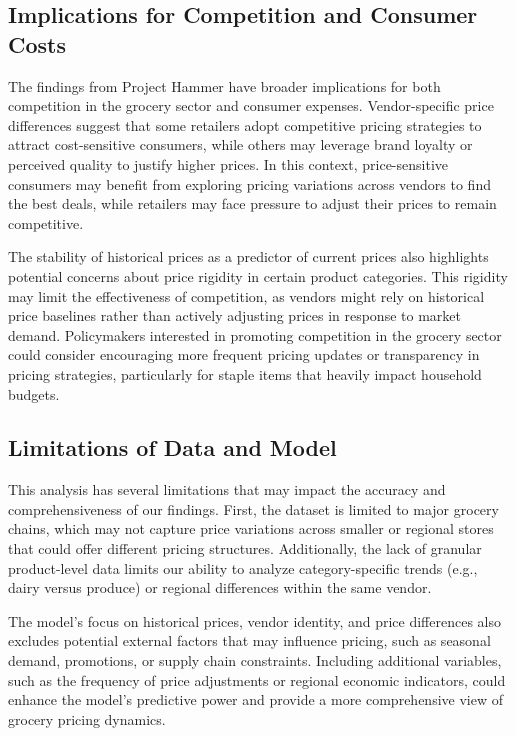 \documentclass[
  letterpaper,
  DIV=11,
  numbers=noendperiod]{scrartcl}
\begin{document}
\subsection{Implications for Competition and Consumer
Costs}\label{implications-for-competition-and-consumer-costs}

The findings from Project Hammer have broader implications for both
competition in the grocery sector and consumer expenses. Vendor-specific
price differences suggest that some retailers adopt competitive pricing
strategies to attract cost-sensitive consumers, while others may
leverage brand loyalty or perceived quality to justify higher prices. In
this context, price-sensitive consumers may benefit from exploring
pricing variations across vendors to find the best deals, while
retailers may face pressure to adjust their prices to remain
competitive.

The stability of historical prices as a predictor of current prices also
highlights potential concerns about price rigidity in certain product
categories. This rigidity may limit the effectiveness of competition, as
vendors might rely on historical price baselines rather than actively
adjusting prices in response to market demand. Policymakers interested
in promoting competition in the grocery sector could consider
encouraging more frequent pricing updates or transparency in pricing
strategies, particularly for staple items that heavily impact household
budgets.

\subsection{Limitations of Data and
Model}\label{limitations-of-data-and-model}

This analysis has several limitations that may impact the accuracy and
comprehensiveness of our findings. First, the dataset is limited to
major grocery chains, which may not capture price variations across
smaller or regional stores that could offer different pricing
structures. Additionally, the lack of granular product-level data limits
our ability to analyze category-specific trends (e.g., dairy versus
produce) or regional differences within the same vendor.

The model's focus on historical prices, vendor identity, and price
differences also excludes potential external factors that may influence
pricing, such as seasonal demand, promotions, or supply chain
constraints. Including additional variables, such as the frequency of
price adjustments or regional economic indicators, could enhance the
model's predictive power and provide a more comprehensive view of
grocery pricing dynamics.
\end{document}
